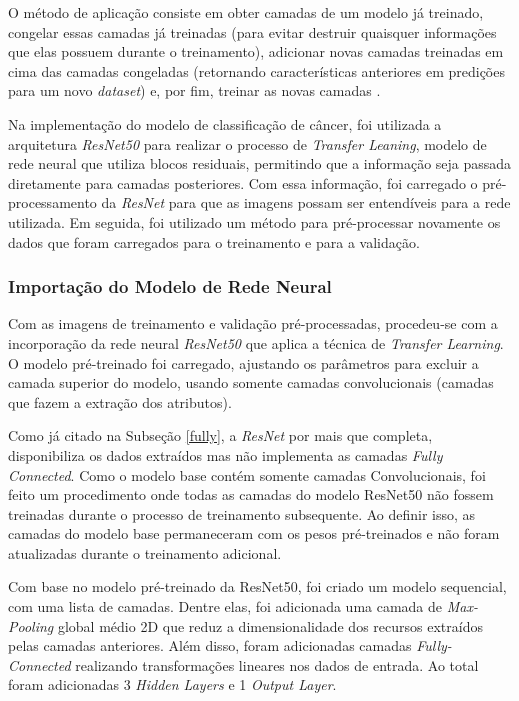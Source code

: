 O método de aplicação consiste em obter camadas de um modelo já treinado, congelar essas camadas já treinadas (para evitar destruir quaisquer informações que elas possuem durante o treinamento), adicionar novas camadas treinadas em cima das camadas congeladas (retornando características anteriores em predições para um novo \textit{dataset}) e, por fim, treinar as novas camadas \cite{kerastransfer}.

Na implementação do modelo de classificação de câncer, foi utilizada a arquitetura \textit{ResNet50} para realizar o processo de \textit{Transfer Leaning}, modelo de rede neural que utiliza blocos residuais, permitindo que a informação seja passada diretamente para camadas posteriores. Com essa informação, foi carregado o pré-processamento da \textit{ResNet} para que as imagens possam ser entendíveis para a rede utilizada. Em seguida, foi utilizado um método para pré-processar novamente os dados que foram carregados para o treinamento e para a validação.



\subsubsection{\esp Importação do Modelo de Rede Neural} \label{camadas}

Com as imagens de treinamento e validação pré-processadas, procedeu-se com a incorporação da rede neural \textit{ResNet50} que aplica a técnica de \textit{Transfer Learning}. O modelo pré-treinado foi carregado, ajustando os parâmetros para excluir a camada superior do modelo, usando somente camadas convolucionais (camadas que fazem a extração dos atributos).

Como já citado na Subseção \ref{fully}, a \textit{ResNet} por mais que completa, disponibiliza os dados extraídos mas não implementa as camadas \textit{Fully Connected}. Como o modelo base contém somente camadas Convolucionais, foi feito um procedimento onde todas as camadas do modelo ResNet50 não fossem treinadas durante o processo de treinamento subsequente. Ao definir isso, as camadas do modelo base permaneceram com os pesos pré-treinados e não foram atualizadas durante o treinamento adicional. 

Com base no modelo pré-treinado da ResNet50, foi criado um modelo sequencial, com uma lista de camadas. Dentre elas, foi adicionada uma camada de \textit{Max-Pooling} global médio 2D que reduz a dimensionalidade dos recursos extraídos pelas camadas anteriores. Além disso, foram adicionadas camadas \textit{Fully-Connected} realizando transformações lineares nos dados de entrada. Ao total foram adicionadas 3 \textit{Hidden Layers} e 1 \textit{Output Layer}.

